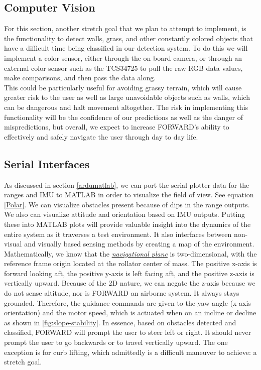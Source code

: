 \subsection{Computer Vision}
\noindent For this section, another stretch goal that we plan to attempt to implement, is the functionality to detect walls, grass, and other constantly colored objects that have a difficult time being classified in our detection system. To do this we will implement a color sensor, either through the on board camera, or through an external color sensor such as the TCS34725 to pull the raw RGB data values, make comparisons, and then pass the data along. \\

\noindent This could be particularly useful for avoiding grassy terrain, which will cause greater risk to the user as well as large unavoidable objects such as walls, which can be dangerous and halt movement altogether. The risk in implementing this functionality will be the confidence of our predictions as well as the danger of mispredictions, but overall, we expect to increase FORWARD's ability to effectively and safely navigate the user through day to day life.

\subsection{Serial Interfaces}
\noindent As discussed in section \ref{ardumatlab}, we can port the serial plotter data for the ranges and IMU to MATLAB in order to visualize the field of view. See equation \ref{Polar}. We can visualize obstacles present because of dips in the range outputs. We also can visualize attitude and orientation based on IMU outputs. Putting these into MATLAB plots will provide valuable insight into the dynamics of the entire system as it traverses a test environment. It also interfaces between non-visual and visually based sensing methods by creating a map of the environment.\\

\noindent Mathematically, we know that the \underline{\textit{navigational plane}} is two-dimensional, with the reference frame origin located at the rollator center of mass. The positive x-axis is forward looking aft, the positive y-axis is left facing aft, and the positive z-axis is vertically upward. Because of the 2D nature, we can negate the z-axis because we do not sense altitude, nor is FORWARD an airborne system. It always stays grounded. Therefore, the guidance commands are given to the yaw angle (x-axis orientation) and the motor speed, which is actuated when on an incline or decline as shown in \ref{fig:slope-stability}. In essence, based on obstacles detected and classified, FORWARD will prompt the user to steer left or right. It should never prompt the user to go backwards or to travel vertically upward. The one exception is for curb lifting, which admittedly is a difficult maneuver to achieve: a stretch goal.
